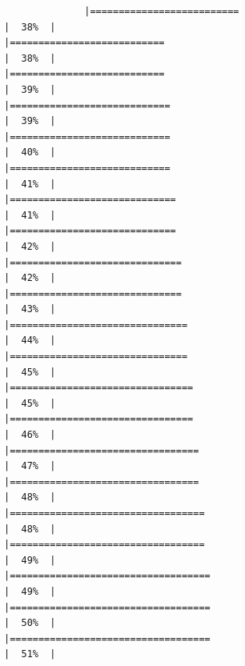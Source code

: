 \documentclass[
]{article}
\begin{document}
\begin{verbatim}
              |==========================                                            |  38%  |                                                                              |===========================                                           |  38%  |                                                                              |===========================                                           |  39%  |                                                                              |============================                                          |  39%  |                                                                              |============================                                          |  40%  |                                                                              |============================                                          |  41%  |                                                                              |=============================                                         |  41%  |                                                                              |=============================                                         |  42%  |                                                                              |==============================                                        |  42%  |                                                                              |==============================                                        |  43%  |                                                                              |===============================                                       |  44%  |                                                                              |===============================                                       |  45%  |                                                                              |================================                                      |  45%  |                                                                              |================================                                      |  46%  |                                                                              |=================================                                     |  47%  |                                                                              |=================================                                     |  48%  |                                                                              |==================================                                    |  48%  |                                                                              |==================================                                    |  49%  |                                                                              |===================================                                   |  49%  |                                                                              |===================================                                   |  50%  |                                                                              |===================================                                   |  51%  |                                                                 
\end{verbatim}
\end{document}
